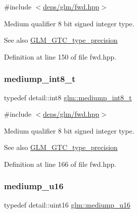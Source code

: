 {\ttfamily \#include $<$\hyperlink{fwd_8hpp}{deps/glm/fwd.\+hpp}$>$}

Medium qualifier 8 bit signed integer type. \begin{DoxySeeAlso}{See also}
\hyperlink{group__gtc__type__precision}{G\+L\+M\+\_\+\+G\+T\+C\+\_\+type\+\_\+precision} 
\end{DoxySeeAlso}


Definition at line 150 of file fwd.\+hpp.

\mbox{\label{group__gtc__type__precision_ga626ac5f73d3538e62a879d6c56abfb36}} 
\subsubsection{\texorpdfstring{mediump\+\_\+int8\+\_\+t}{mediump\_int8\_t}}
{\footnotesize\ttfamily typedef detail\+::int8 \hyperlink{group__gtc__type__precision_ga626ac5f73d3538e62a879d6c56abfb36}{glm\+::mediump\+\_\+int8\+\_\+t}}



{\ttfamily \#include $<$\hyperlink{fwd_8hpp}{deps/glm/fwd.\+hpp}$>$}

Medium qualifier 8 bit signed integer type. \begin{DoxySeeAlso}{See also}
\hyperlink{group__gtc__type__precision}{G\+L\+M\+\_\+\+G\+T\+C\+\_\+type\+\_\+precision} 
\end{DoxySeeAlso}


Definition at line 166 of file fwd.\+hpp.

\mbox{\label{group__gtc__type__precision_ga6745262ef6a6fdb8637b2387ef924828}} 
\subsubsection{\texorpdfstring{mediump\+\_\+u16}{mediump\_u16}}
{\footnotesize\ttfamily typedef detail\+::uint16 \hyperlink{group__gtc__type__precision_ga6745262ef6a6fdb8637b2387ef924828}{glm\+::mediump\+\_\+u16}}



